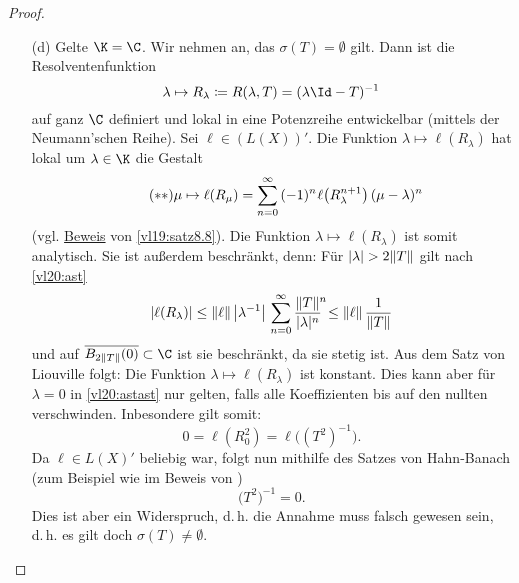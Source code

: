 \begin{proof}
\begin{enumerate}[(a)]
        \item[(d)]
            Gelte $\K=\C$.
            Wir nehmen an, das $\sigma(T)=\emptyset$ gilt. Dann ist die
            Resolventenfunktion
            \[ \lambda\mapsto R_\lambda \defeq R(\lambda,T) 
                = (\lambda\Id-T)^{-1}
            \]
            auf ganz $\C$ definiert und lokal in eine Potenzreihe entwickelbar
            (mittels der Neumann'schen Reihe). Sei $\ell\in (L(X))'$. Die Funktion
            $\lambda \mapsto \ell(R_\lambda)$
            hat lokal um $\lambda\in\K$ die Gestalt
            \[ \tag{$\ast\ast$} \label{vl20:astast}
                \mu\mapsto \ell(R_\mu) = \nsum[0]^\infty \,
                (-1)^n \mkern1mu \ell\bigl(R_\lambda^{n+1}\bigr) \, (\mu-\lambda)^n
            \]
            (vgl. \hyperref[vl19:satz8.8:beweis]{Beweis} von \cref{vl19:satz8.8}).
            Die Funktion $\lambda \mapsto \ell(R_\lambda)$ ist somit analytisch.
            Sie ist außerdem beschränkt, denn: Für $\abs\lambda > 2\norm{T}$
            gilt nach \eqref{vl20:ast}
            \[ \abs{\ell(R_\lambda)}
                \leq \norm\ell \, \abs[\big]{\lambda^{-1}} \, \nsum[0]^\infty
                \frac{\norm{T}^{\mathrlap{n}}}{\abs{\lambda}^n} 
                \mkern3mu 
                \leq \norm\ell \, \frac{1}{\norm{T}}
            \]
            und auf $\setclosure{B_{2\norm{T}}(0)}\subset\C$ ist sie beschränkt,
            da sie stetig ist. Aus dem Satz von Liouville folgt: Die Funktion
            $\lambda\mapsto\ell(R_\lambda)$ ist konstant. Dies kann aber für
            $\lambda=0$ in \eqref{vl20:astast} nur gelten, falls alle
            Koeffizienten bis auf den nullten verschwinden. Inbesondere gilt
            somit:
            \[ 0 = \ell(R_0^2) = \ell\bigl( (T^2)^{-1} \bigr) .\]
            Da $\ell\in L(X)'$ beliebig war, folgt nun mithilfe des Satzes von
            Hahn-Banach (zum Beispiel wie im Beweis von )
            \[ \bigl( T^2 \bigr)^{-1} = 0 . \]
            Dies ist aber ein Widerspruch, d.\,h. die Annahme muss falsch
            gewesen sein, d.\,h. es gilt doch $\sigma(T)\neq\emptyset$.
            

\end{enumerate}
\end{proof}
